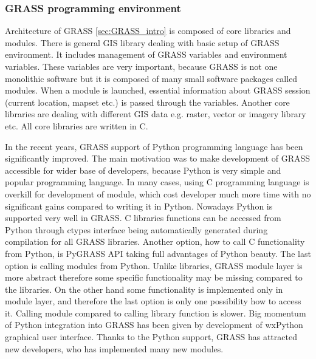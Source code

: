 \documentclass[a4paper,12pt]{article}
\begin{document}
\subsubsection{GRASS programming  environment}




Architecture of GRASS \ref{sec:GRASS_intro} is composed of core libraries and modules. There is general GIS library 
dealing with basic setup of GRASS environment. It includes management of
GRASS variables and environment variables. These variables are very important, because GRASS is not one monolithic software 
but it is composed of many small software packages called modules. When a module is launched, essential information 
about GRASS session (current location, mapset etc.) is passed through the variables. 
Another core libraries are dealing with different GIS data e.g. raster, vector or imagery library etc. 
All core libraries are written in C. 

In the recent years, GRASS support of Python programming language has been significantly 
improved. The main motivation was to make development of GRASS accessible for wider base
of developers, because Python is very simple and popular programming language. 
In many cases, using 
C programming language is overkill for development of module, which cost developer much more time 
with no significant gains compared to writing it in Python. Nowadays Python is supported very well in GRASS.
C libraries functions can be accessed from Python through ctypes interface being automatically generated during compilation
for all GRASS libraries.  
Another option, how to call C functionality from Python, is 
PyGRASS API taking full advantages of Python beauty.
The last option is calling modules from Python. Unlike libraries, GRASS module layer is more abstract
therefore some specific functionality may be missing compared to the libraries. 
On the other hand some functionality is implemented
only in module layer, and therefore the last option is only one possibility how to access it.
Calling module compared to calling library function is slower.
Big momentum of Python integration into GRASS has been given by development of wxPython graphical
user interface. 
Thanks to the Python support, GRASS has attracted new developers, who has implemented many new modules.
\end{document}
